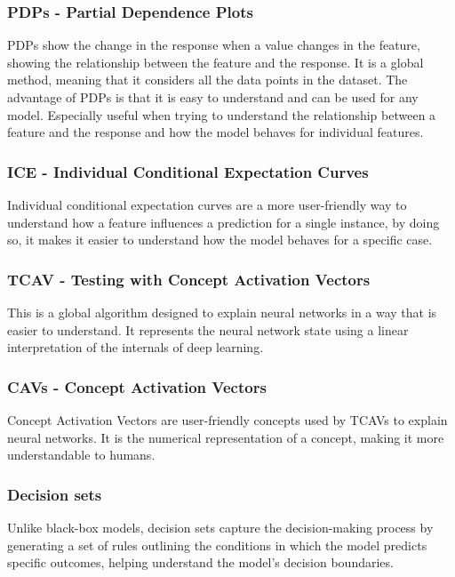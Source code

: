 \documentclass[10pt,journal,compsoc]{IEEEtran}
\begin{document}
\subsubsection{PDPs - Partial Dependence Plots}
PDPs show the change in the response when a value changes in the feature, showing the relationship between the feature and the response. It is a global method, meaning that it considers all the data points in the dataset.
The advantage of PDPs is that it is easy to understand and can be used for any model. Especially useful when trying to understand the relationship between a feature and the response and how the model behaves for individual features.\cite{phillips2020four}

\subsubsection{ICE - Individual Conditional Expectation Curves}
Individual conditional expectation curves are a more user-friendly way to understand how a feature influences a prediction for a single instance, by doing so, it makes it easier to understand how the model behaves for a specific case.

\subsubsection{TCAV - Testing with Concept Activation Vectors}
This is a global algorithm designed to explain neural networks in a way that is easier to understand. It represents the neural network state using a linear interpretation of the internals of deep learning.

\subsubsection{CAVs - Concept Activation Vectors}
Concept Activation Vectors are user-friendly concepts used by TCAVs to explain neural networks. It is the numerical representation of a concept, making it more understandable to humans.

\subsubsection{Decision sets}
Unlike black-box models, decision sets capture the decision-making process by generating a set of rules outlining the conditions in which the model predicts specific outcomes, helping understand the model's decision boundaries.
\end{document}
